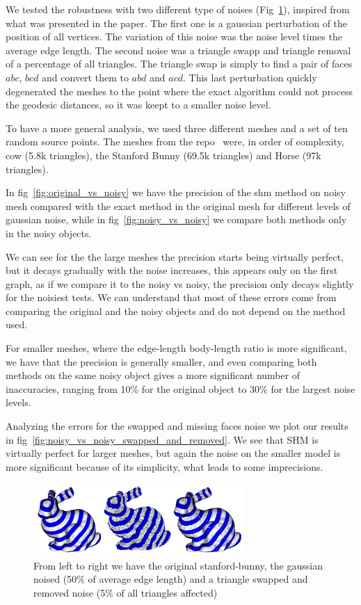\documentclass[sigconf]{acmart}
\begin{document}
We tested the robustness with two different type of noises (Fig~\ref{fig:all_bunnies}), inspired from what was presented in the paper. 
The first one is a gaussian perturbation of the position of all vertices. The variation of this noise was the noise level times the average edge length.
The second noise was a triangle swapp and triangle removal of a percentage of all triangles.
The triangle swap is simply to find a pair of faces $abc$, $bcd$ and convert them to $abd$ and $acd$.
This last perturbation quickly degenerated the meshes to the point where the exact algorithm could not
process the geodesic distances, so it was keept to a smaller noise level. 

To have a more general analysis, we used three different meshes and a set of ten random
source points. The meshes from the repo~\cite{github_objects_repo} were, in order of complexity, cow (5.8k triangles), the Stanford Bunny (69.5k triangles) and Horse (97k triangles).

In fig~\ref{fig:original_vs_noisy} we have the precision of the shm method on noisy mesh compared with the exact method in the original mesh for
different levels of gaussian noise, while in fig~\ref{fig:noisy_vs_noisy} we compare both methods only in the noisy objects.

We can see for the the large meshes the precision starts being virtually perfect, but it
decays gradually with the noise increases, this appears only on the first graph, as if we compare it to the noisy vs noisy, the precision
only decays slightly for the noisiest tests. We can understand that most of these errors come from comparing the original and the noisy objects
and do not depend on the method used.

For smaller meshes, where the edge-length body-length ratio is more significant, we have that the precision is generally smaller,
and even comparing both methods on the same noisy object gives a more significant number of inaccuracies, ranging from 10\% for the
original object to 30\% for the largest noise levels.

Analyzing the errors for the swapped and missing faces noise we plot our results
in fig~\ref{fig:noisy_vs_noisy_swapped_and_removed}. We see that SHM is virtually perfect
for larger meshes, but again the noise on the smaller model is more significant because
of its simplicity, what leads to some imprecisions. 

\begin{figure}
  \centering
  \includegraphics[width=8cm]{all_bunnies.png}
  \caption{From left to right we have the original stanford-bunny, the gaussian noised (50\% of average edge length) and a triangle swapped and removed noise (5\% of all triangles affected)}
  \label{fig:all_bunnies}
  \Description{}
\end{figure}
\end{document}
